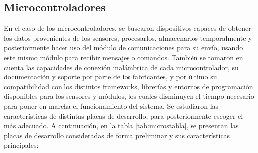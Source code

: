 \subsection{Microcontroladores}

En el caso de los microcontroladores, se buscaron dispositivos capaces de obtener los datos provenientes de los sensores, procesarlos, almacenarlos temporalmente y posteriormente hacer uso del módulo de comunicaciones para su envío, usando este mismo módulo para recibir mensajes o comandos. También se tomaron en cuenta las capacidades de conexión inalámbrica de cada microcontrolador, su documentación y soporte por parte de los fabricantes, y por último su compatibilidad con los distintos frameworks, librerías y entornos de programación disponibles para los sensores y módulos, los cuales disminuyen el tiempo necesario para poner en marcha el funcionamiento del sistema. Se estudiaron las características de distintas placas de desarrollo, para posteriormente escoger el más adecuado. A continuación, en la tabla \ref{tab:microstabla}, se presentan las placas de desarrollo consideradas de forma preliminar y sus características principales:

